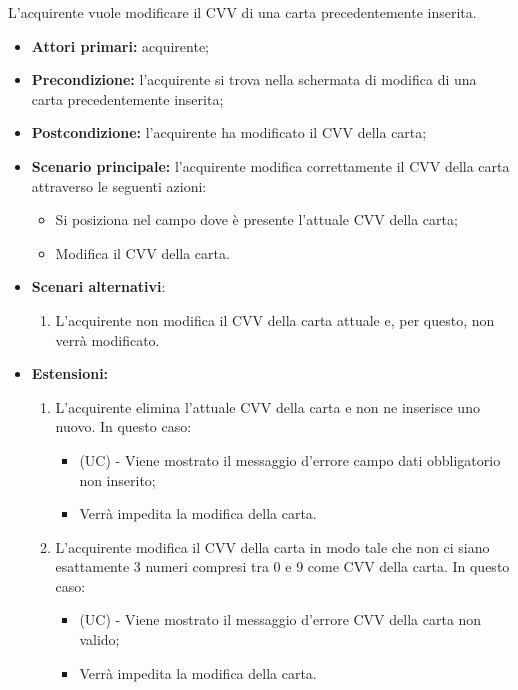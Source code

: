 L'acquirente vuole modificare il CVV di una carta precedentemente inserita.
\begin{itemize}
    \item \textbf{Attori primari:} acquirente;
    \item \textbf{Precondizione:} l'acquirente si trova nella schermata di modifica di una carta precedentemente inserita;
    \item \textbf{Postcondizione:} l'acquirente ha modificato il CVV della carta;
    \item \textbf{Scenario principale:} l'acquirente modifica correttamente il CVV della carta attraverso le seguenti azioni:
    \begin{itemize}
        \item Si posiziona nel campo dove è presente l'attuale CVV della carta;
        \item Modifica il CVV della carta.
    \end{itemize}
    \item \textbf{Scenari alternativi}:
    \begin{enumerate}[label=\lett]
        \item L'acquirente non modifica il CVV della carta attuale e, per questo, non verrà modificato.
    \end{enumerate}
    \item \textbf{Estensioni:}
    \begin{enumerate}[label=\lett]
        \item L'acquirente elimina l'attuale CVV della carta e non ne inserisce uno nuovo. In questo caso:
        \begin{itemize}
            \item (UC) - Viene mostrato il messaggio d'errore campo dati obbligatorio non inserito;
            \item Verrà impedita la modifica della carta.
        \end{itemize}
        \item L'acquirente modifica il CVV della carta in modo tale che non ci siano esattamente 3 numeri compresi tra 0 e 9 come CVV della carta. In questo caso:
        \begin{itemize}
            \item (UC) - Viene mostrato il messaggio d'errore CVV della carta non valido;
            \item Verrà impedita la modifica della carta.
        \end{itemize}
    \end{enumerate}
\end{itemize}

